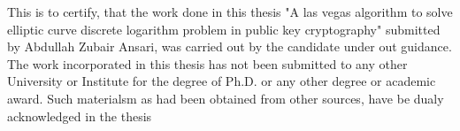This is to certify, that the work done in this thesis "A las vegas algorithm to solve elliptic curve discrete logarithm problem in public key cryptography" submitted by Abdullah Zubair Ansari, was carried out by the candidate under out guidance. The work incorporated in this thesis has not been submitted to any other University or Institute for the degree of Ph.D. or any other degree or academic award. Such materialsm as had been obtained from other sources, have be dualy acknowledged in the thesis
